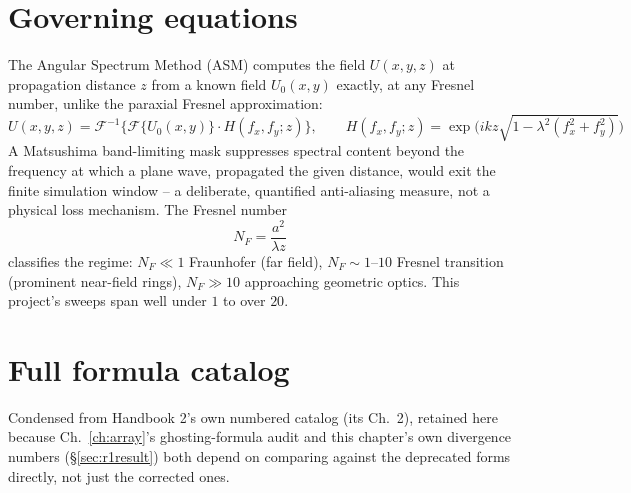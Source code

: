 \documentclass[11pt]{report}
\begin{document}
\section{Governing equations}
The Angular Spectrum Method (ASM) computes the field $U(x,y,z)$ at propagation distance $z$
from a known field $U_0(x,y)$ exactly, at any Fresnel number, unlike the paraxial Fresnel
approximation:
\begin{equation}
U(x,y,z) = \mathcal{F}^{-1}\Big\{\mathcal{F}\{U_0(x,y)\}\cdot H(f_x,f_y;z)\Big\}, \qquad
H(f_x,f_y;z) = \exp\!\Big(ikz\sqrt{1-\lambda^2(f_x^2+f_y^2)}\Big)
\label{eq:asm3}
\end{equation}
A Matsushima band-limiting mask suppresses spectral content beyond the frequency at which a
plane wave, propagated the given distance, would exit the finite simulation window -- a
deliberate, quantified anti-aliasing measure, not a physical loss mechanism. The Fresnel
number
\begin{equation}
N_F = \frac{a^2}{\lambda z}
\label{eq:fresnelnumber3}
\end{equation}
classifies the regime: $N_F\ll1$ Fraunhofer (far field), $N_F\sim1$--$10$ Fresnel transition
(prominent near-field rings), $N_F\gg10$ approaching geometric optics. This project's sweeps
span well under $1$ to over $20$.

\section{Full formula catalog}
\label{sec:formulacatalog}
Condensed from Handbook 2's own numbered catalog (its Ch.~2), retained here because
Ch.~\ref{ch:array}'s ghosting-formula audit and this chapter's own divergence numbers
(\S\ref{sec:r1result}) both depend on comparing against the deprecated forms directly, not
just the corrected ones.
\end{document}
